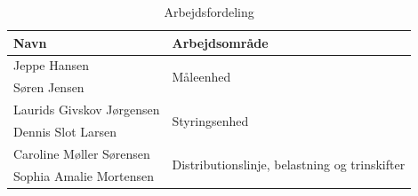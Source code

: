 \begin{table}[H]
	\centering
	\caption{Arbejdsfordeling}
	\label{tab:arbejdsfordeling}
	\begin{tabular}{@{}ll@{}}
		\toprule
		Navn                    & Arbejdsområde                                                  \\ \midrule
		Jeppe Hansen            & \multirow{2}{*}{Måleenhed}                                     \\
		Søren Jensen            &                                                                \\\midrule
		Laurids Givskov Jørgensen       & \multirow{2}{*}{Styringsenhed}                                 \\
		Dennis Slot Larsen            &                                                                \\\midrule
		Caroline Møller Sørensen       & \multirow{2}{*}{Distributionslinje, belastning og trinskifter} \\
		Sophia Amalie Mortensen &                                                                \\ \midrule
	\end{tabular}
\end{table}


